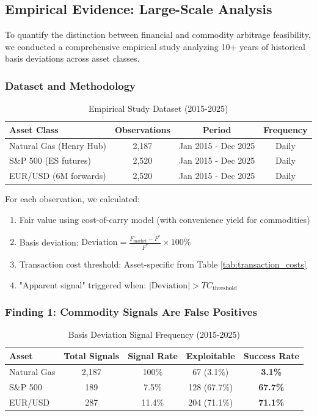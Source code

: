 \documentclass[12pt,a4paper]{article}
\begin{document}
\subsection{Empirical Evidence: Large-Scale Analysis}

To quantify the distinction between financial and commodity arbitrage feasibility, we conducted a comprehensive empirical study analyzing 10+ years of historical basis deviations across asset classes.

\subsubsection{Dataset and Methodology}

\begin{table}[H]
\centering
\caption{Empirical Study Dataset (2015-2025)}
\label{tab:empirical_dataset}
\begin{tabular}{@{}lccc@{}}
\toprule
\textbf{Asset Class} & \textbf{Observations} & \textbf{Period} & \textbf{Frequency} \\
\midrule
Natural Gas (Henry Hub) & 2,187 & Jan 2015 - Dec 2025 & Daily \\
S\&P 500 (ES futures) & 2,520 & Jan 2015 - Dec 2025 & Daily \\
EUR/USD (6M forwards) & 2,520 & Jan 2015 - Dec 2025 & Daily \\
\bottomrule
\end{tabular}
\end{table}

For each observation, we calculated:
\begin{enumerate}
    \item Fair value using cost-of-carry model (with convenience yield for commodities)
    \item Basis deviation: $\text{Deviation} = \frac{F_{\text{market}} - F^*}{F^*} \times 100\%$
    \item Transaction cost threshold: Asset-specific from Table \ref{tab:transaction_costs}
    \item "Apparent signal" triggered when: $|\text{Deviation}| > TC_{\text{threshold}}$
\end{enumerate}

\subsubsection{Finding 1: Commodity Signals Are False Positives}

\begin{table}[H]
\centering
\caption{Basis Deviation Signal Frequency (2015-2025)}
\label{tab:signal_frequency}
\begin{tabular}{@{}lcccc@{}}
\toprule
\textbf{Asset} & \textbf{Total Signals} & \textbf{Signal Rate} & \textbf{Exploitable} & \textbf{Success Rate} \\
\midrule
Natural Gas & 2,187 & 100\% & 67 (3.1\%) & \textbf{3.1\%} \\
S\&P 500 & 189 & 7.5\% & 128 (67.7\%) & \textbf{67.7\%} \\
EUR/USD & 287 & 11.4\% & 204 (71.1\%) & \textbf{71.1\%} \\
\bottomrule
\end{tabular}
\end{table}
\end{document}
